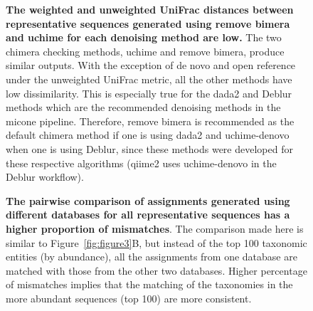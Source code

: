     \begin{figure}[H]
      \centering
        \caption{
          \textbf{The weighted and unweighted UniFrac distances between representative sequences generated using remove bimera and uchime for each denoising method are low.}
          The two chimera checking methods, uchime and remove bimera, produce similar outputs.
          With the exception of de novo and open reference under the unweighted UniFrac metric, all the other methods have low dissimilarity.
          This is especially true for the \ac{dada2} and Deblur methods which are the recommended denoising methods in the \ac{micone} pipeline.
          Therefore, remove bimera is recommended as the default chimera method if one is using \ac{dada2} and uchime-denovo when one is using Deblur, since these methods were developed for these respective algorithms (\ac{qiime2} uses uchime-denovo in the Deblur workflow).
        }
      \label{fig:figure_s3}
    \end{figure}

    \begin{figure}[H]
      \centering
        \caption{
          \textbf{The pairwise comparison of assignments generated using different databases for all representative sequences has a higher proportion of mismatches}.
          The comparison made here is similar to Figure~\ref{fig:figure3}B, but instead of the top 100 taxonomic entities (by abundance), all the assignments from one database are matched with those from the other two databases.
          Higher percentage of mismatches implies that the matching of the taxonomies in the more abundant sequences (top 100) are more consistent.
        }
      \label{fig:figure_s4}
    \end{figure}

